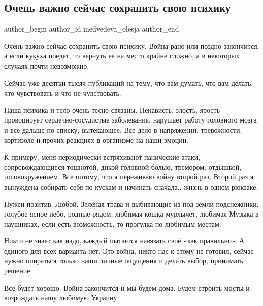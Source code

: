  
 
 
 
 
 
\subsection{Очень важно сейчас сохранить свою психику}
\label{sec:16_03_2022.tg.medvedeva_olesja.1.psihika}
 
\ifcmt
 author_begin
   author_id medvedeva_olesja
 author_end
\fi

Очень важно сейчас сохранить свою психику. Война рано или поздно закончится, а
если кукуха поедет, то вернуть ее на место крайне сложно, а в некоторых случаях
почти невозможно.

Сейчас уже десятки тысяч публикаций на тему, что вам думать, что вам делать,
что чувствовать и что не чувствовать.

Наша психика и тело очень тесно связаны. Ненависть, злость, ярость провоцирует
сердечно-сосудистые заболевания, нарушает работу головного мозга и все дальше
по списку, вытекающее. Все дело в напряжении, тревожности, кортизоле и прочих
реакциях в организме на наши эмоции.

К примеру, меня периодически встряхивают панические атаки, сопровождающиеся
тошнотой, дикой головной болью, тремором, отдышкой, головокружением. Все
потому, что я переживаю войну второй раз. Второй раз я вынуждена собирать себя
по кускам и начинать сначала.. жизнь в одном рюкзаке.

Нужен позитив. Любой. Зелёная трава и выбивающие из-под земли подснежники,
голубое ясное небо, родные рядом, любимая кошка мурлычет, любимая Музыка в
наушниках, если есть возможность, то прогулка по любимым местам.

Никто не знает как надо, каждый пытается навязать своё «как правильно». А
единого для всех варианта нет. Это война, никто нас к этому не готовил, сейчас
нужно опираться только наши личные ощущения и делать выбор, принимать решение.

Все будет хорошо. Война закончится и мы будем дома. Будем строить мосты и
возрождать нашу любимую Украину.
